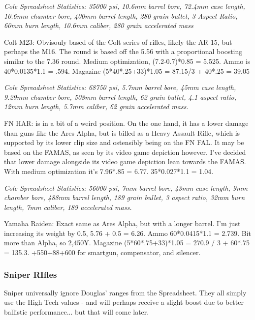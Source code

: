 \begin{multicols*}{2}
	\textit{\textcolor{OliveGreen}{Cole Spreadsheet Statistics: 35000 psi, 10.6mm barrel bore, 72.4mm case length, 10.6mm chamber bore, 400mm barrel length, 280 grain bullet, 3 Aspect Ratio, 60mm burn length, 10.6mm caliber, 280 grain accelerated mass}}
	
	Colt M23: Obvisouly based of the Colt series of rifles, likely the AR-15, but perhaps the M16. The round is based off the 5.56 with a proportional boosting similar to the 7.36 round. Medium optimization, (7.2-0.7)*0.85 = 5.525. Ammo is 40*0.0135*1.1 = .594. Magazine (5*40*.25+33)*1.05 = 87.15/3 + 40*.25 = 39.05
	
	\textit{\textcolor{OliveGreen}{Cole Spreadsheet Statistics: 68750 psi, 5.7mm barrel bore, 45mm case length, 9.29mm chamber bore, 508mm barrel length, 62 grain bullet, 4.1 aspect ratio, 12mm burn length, 5.7mm caliber, 62 grain accelerated mass.}}
	
	FN HAR: is in a bit of a weird position. On the one hand, it has a lower damage than guns like the Ares Alpha, but is billed as a Heavy Assault Rifle, which is supported by its lower clip size and ostensibly being on the FN FAL. It may be based on the FAMAS, as seen by its video game depiction however. I've decided that lower damage alongside its video game depiction lean towards the FAMAS. With medium optimization it's 7.96*.85 = 6.77. 35*0.027*1.1 = 1.04.
	
	\textit{\textcolor{OliveGreen}{Cole Spreadsheet Statistics:  56000 psi, 7mm barrel bore, 43mm case length, 9mm chamber bore, 488mm barrel length, 189 grain bullet, 3 aspect ratio, 32mm burn length, 7mm caliber, 189 accelerated mass.}}
	
	Yamaha Raiden: Exact same as Ares Alpha, but with a longer barrel. I'm just increasing its weight by 0.5, 5.76 + 0.5 = 6.26. Ammo 60*0.0415*1.1 = 2.739. Bit more than Alpha, so 2,450¥. Magazine (5*60*.75+33)*1.05 = 270.9 / 3 + 60*.75 = 135.3. +550+88+600 for smartgun, compensator, and silencer.
	
	\subsubsection{Sniper RIfles}
	
	Sniper universally ignore Douglas' ranges from the Spreadsheet. They all simply use the High Tech values - and will perhaps receive a slight boost due to better ballistic performance... but that will come later.
	

\end{multicols*}
